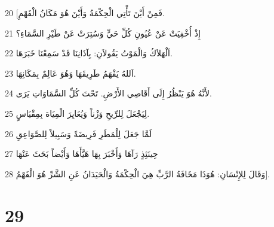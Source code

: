 \par 20 [فَمِنْ أَيْنَ تَأْتِي الْحِكْمَةُ وَأَيْنَ هُوَ مَكَانُ الْفَهْمِ.
\par 21 إِذْ أُخْفِيَتْ عَنْ عُيُونِ كُلِّ حَيٍّ وَسُتِرَتْ عَنْ طَيْرِ السَّمَاءِ؟
\par 22 اَلْهَلاَكُ وَالْمَوْتُ يَقُولاَنِ: بِآذَانِنَا قَدْ سَمِعْنَا خَبَرَهَا.
\par 23 اَللهُ يَفْهَمُ طَرِيقَهَا وَهُوَ عَالِمٌ بِمَكَانِهَا.
\par 24 لأَنَّهُ هُوَ يَنْظُرُ إِلَى أَقَاصِي الأَرْضِ. تَحْتَ كُلِّ السَّمَاوَاتِ يَرَى.
\par 25 لِيَجْعَلَ لِلرِّيحِ وَزْناً وَيُعَايِرَ الْمِيَاهَ بِمِقْيَاسٍ.
\par 26 لَمَّا جَعَلَ لِلْمَطَرِ فَرِيضَةً وَسَبِيلاً لِلصَّوَاعِقِ
\par 27 حِينَئِذٍ رَآهَا وَأَخْبَرَ بِهَا هَيَّأَهَا وَأَيْضاً بَحَثَ عَنْهَا
\par 28 وَقَالَ لِلإِنْسَانِ: هُوَذَا مَخَافَةُ الرَّبِّ هِيَ الْحِكْمَةُ وَالْحَيَدَانُ عَنِ الشَّرِّ هُوَ الْفَهْمُ].

\chapter{29}

